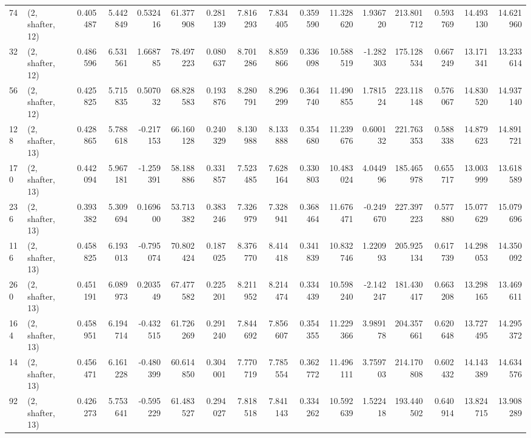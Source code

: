 \begin{tabular}{llrrrrrrrrrrrrrr}
74  &  (2, shafter, 12) &   0.405487 &   5.442849 &   0.532416 &    61.377908 &   0.281139 &   7.816293 &   7.834405 &  0.359590 &  11.328620 &   1.936720 &   213.801712 &  0.593769 &  14.493130 &  14.621960 \\
32  &  (2, shafter, 12) &   0.486596 &   6.531561 &   1.668785 &    78.497223 &   0.080637 &   8.701286 &   8.859866 &  0.336098 &  10.588519 &  -1.282303 &   175.128534 &  0.667249 &  13.171341 &  13.233614 \\
56  &  (2, shafter, 12) &   0.425825 &   5.715835 &   0.507032 &    68.828583 &   0.193876 &   8.280791 &   8.296299 &  0.364740 &  11.490855 &   1.781524 &   223.118148 &  0.576067 &  14.830520 &  14.937140 \\
128 &  (2, shafter, 13) &   0.428865 &   5.788618 &  -0.217153 &    66.160128 &   0.240329 &   8.130988 &   8.133888 &  0.354680 &  11.239676 &   0.600132 &   221.763353 &  0.588338 &  14.879623 &  14.891721 \\
170 &  (2, shafter, 13) &   0.442094 &   5.967181 &  -1.259391 &    58.188886 &   0.331857 &   7.523485 &   7.628164 &  0.330803 &  10.483024 &   4.044996 &   185.465978 &  0.655717 &  13.003999 &  13.618589 \\
236 &  (2, shafter, 13) &   0.393382 &   5.309694 &   0.169600 &    53.713382 &   0.383246 &   7.326979 &   7.328941 &  0.368464 &  11.676471 &  -0.249670 &   227.397223 &  0.577880 &  15.077629 &  15.079696 \\
116 &  (2, shafter, 13) &   0.458825 &   6.193013 &  -0.795074 &    70.802424 &   0.187025 &   8.376770 &   8.414418 &  0.341839 &  10.832746 &   1.220993 &   205.925134 &  0.617739 &  14.298053 &  14.350092 \\
260 &  (2, shafter, 13) &   0.451191 &   6.089973 &   0.203549 &    67.477582 &   0.225201 &   8.211952 &   8.214474 &  0.334439 &  10.598240 &  -2.142247 &   181.430417 &  0.663208 &  13.298165 &  13.469611 \\
164 &  (2, shafter, 13) &   0.458951 &   6.194714 &  -0.432515 &    61.726269 &   0.291240 &   7.844692 &   7.856607 &  0.354355 &  11.229366 &   3.989178 &   204.357661 &  0.620648 &  13.727495 &  14.295372 \\
14  &  (2, shafter, 13) &   0.456471 &   6.161228 &  -0.480399 &    60.614850 &   0.304001 &   7.770719 &   7.785554 &  0.362772 &  11.496111 &   3.759703 &   214.170808 &  0.602432 &  14.143389 &  14.634576 \\
92  &  (2, shafter, 13) &   0.426273 &   5.753641 &  -0.595229 &    61.483527 &   0.294027 &   7.818518 &   7.841143 &  0.334262 &  10.592639 &   1.522418 &   193.440502 &  0.640914 &  13.824715 &  13.908289 \\

\end{tabular}
